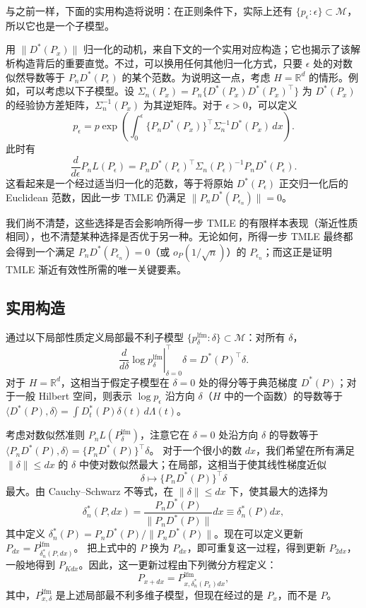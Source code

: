 与之前一样，下面的实用构造将说明：在正则条件下，实际上还有 $\{p_\epsilon:\epsilon\}\subset\mathcal M$，所以它也是一个子模型。

用 $\|D^*(P_x)\|$ 归一化的动机，来自下文的一个实用对应构造；它也揭示了该解析构造背后的重要直觉。不过，可以换用任何其他归一化方式，只要 $\epsilon$ 处的对数似然导数等于 $P_nD^*(P_\epsilon)$ 的某个范数。为说明这一点，考虑 $H=\mathbb R^d$ 的情形。例如，可以考虑以下子模型。设
$\Sigma_n(P_x)=P_n\{D^*(P_x)D^*(P_x)^\top\}$
为 $D^*(P_x)$ 的经验协方差矩阵，$\Sigma_n^{-1}(P_x)$ 为其逆矩阵。对于 $\epsilon>0$，可以定义
\[
 p_\epsilon=p\exp\left(\int_0^\epsilon
 \{P_nD^*(P_x)\}^\top\Sigma_n^{-1}D^*(P_x)\,dx\right).
\]
此时有
\[
 \frac{d}{d\epsilon}P_nL(P_\epsilon)
 =P_nD^*(P_\epsilon)^\top
 \Sigma_n(P_\epsilon)^{-1}P_nD^*(P_\epsilon).
\]
这看起来是一个经过适当归一化的范数，等于将原始 $D^*(P_\epsilon)$ 正交归一化后的 Euclidean 范数，因此一步 TMLE 仍满足 $\|P_nD^*(P_{\epsilon_n})\|=0$。

我们尚不清楚，这些选择是否会影响所得一步 TMLE 的有限样本表现（渐近性质相同），也不清楚某种选择是否优于另一种。无论如何，所得一步 TMLE 最终都会得到一个满足 $P_nD^*(P_{\epsilon_n})=0$（或 $o_P(1/\sqrt n)$）的 $P_{\epsilon_n}$；而这正是证明 TMLE 渐近有效性所需的唯一关键要素。

\subsection{实用构造}

通过以下局部性质定义局部最不利子模型 $\{p_\delta^{\mathrm{lfm}}:\delta\}\subset\mathcal M$：对所有 $\delta$，
\[
 \left.\frac{d}{d\delta}\log p_\delta^{\mathrm{lfm}}
 \right|_{\delta=0}^{\top}\delta
 =D^*(P)^\top\delta.
\]
对于 $H=\mathbb R^d$，这相当于假定子模型在 $\delta=0$ 处的得分等于典范梯度 $D^*(P)$；对于一般 Hilbert 空间，则表示 $\log p_\epsilon$ 沿方向 $\delta$（$H$ 中的一个函数）的导数等于
$\langle D^*(P),\delta\rangle=\int D_t^*(P)\delta(t)\,d\Lambda(t)$。

考虑对数似然准则 $P_nL(P_\delta^{\mathrm{lfm}})$，注意它在 $\delta=0$ 处沿方向 $\delta$ 的导数等于
$\langle P_nD^*(P),\delta\rangle=\{P_nD^*(P)\}^\top\delta$。
对于一个很小的数 $dx$，我们希望在所有满足 $\|\delta\|\leq dx$ 的 $\delta$ 中使对数似然最大；在局部，这相当于使其线性梯度近似
\[
 \delta\mapsto\{P_nD^*(P)\}^\top\delta
\]
最大。由 Cauchy--Schwarz 不等式，在 $\|\delta\|\leq dx$ 下，使其最大的选择为
\[
 \delta_n^*(P,dx)=\frac{P_nD^*(P)}{\|P_nD^*(P)\|}dx
 \equiv\delta_n^*(P)dx,
\]
其中定义 $\delta_n^*(P)=P_nD^*(P)/\|P_nD^*(P)\|$。现在可以定义更新
$P_{dx}=P_{\delta_n^*(P,dx)}^{\mathrm{lfm}}$。
把上式中的 $P$ 换为 $P_{dx}$，即可重复这一过程，得到更新 $P_{2dx}$，一般地得到 $P_{Kdx}$。因此，这一更新过程由下列微分方程定义：
\[
 P_{x+dx}=P_{x,\delta_n^*(P_x)dx}^{\mathrm{lfm}},
\]
其中，$P_{x,\delta}^{\mathrm{lfm}}$ 是上述局部最不利多维子模型，但现在经过的是 $P_x$，而不是 $P$。

